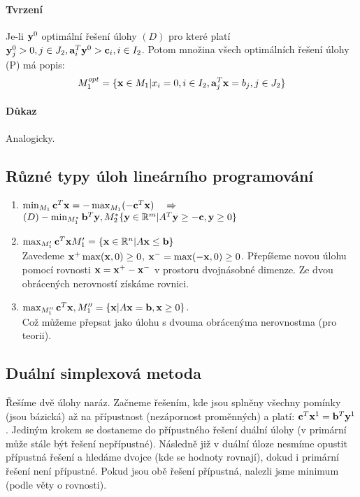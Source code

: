 \documentclass[a4paper,12pt,titlepage]{article}
\begin{document}
\begin{enumerate}
	\paragraph{Tvrzení}
	Je-li $\mathbf{y}^0$ optimální řešení úlohy $(D)$ pro které platí $\mathbf{y}_j^0 > 0, j \in
	J_2, \mathbf{a}_i^T \mathbf{y}^0 > \mathbf{c}_i, i \in I_2$. Potom množina všech optimálních
	řešení úlohy (P) má popis:
	\begin{align}
		M_1^{opt} = \{ \mathbf{x} \in M_1 | x_i = 0, i \in I_2, \mathbf{a}_j^T \mathbf{x} = b_j, j
		\in J_2 \}
	\end{align}
	\paragraph{Důkaz}
	Analogicky.

\subsection{Různé typy úloh lineárního programování}
\setcounter{equation}{0}
\begin{enumerate}
	\item $\min_{M_1} \mathbf{c}^T \mathbf{x} = - \max_{M_1} (-\mathbf{c}^T\mathbf{x}) \quad \Rightarrow
	\quad$\\
	$ (D) - \min_{M_1^*} \mathbf{b}^T \mathbf{y}, M_2^* \{ \mathbf{y} \in \mathbb{R}^m | A^T\mathbf{y}\ge -\mathbf{c},
	\mathbf{y}\ge 0\}$
	\item $\max_{M_1'} \mathbf{c}^T \mathbf{x} M_1' = \{ \mathbf{x} \in \mathbb{R}^n | A\mathbf{x} \le \mathbf{b} \}$ \\
	Zavedeme $\mathbf{x}^+ \max(\mathbf{x}, 0) \ge 0$, $\mathbf{x}^- = \max(-\mathbf{x}, 0) \ge 0$.
	Přepíšeme novou úlohu pomocí rovnosti $\mathbf{x}= \mathbf{x}^+ - \mathbf{x}^-$ v prostoru
	dvojnásobné dimenze. Ze dvou obrácených nerovností získáme rovnici.
	\item $\max_{M_1''} \mathbf{c}^T \mathbf{x}, M_1'' = \{\mathbf{x} | A\mathbf{x} = \mathbf{b}, \mathbf{x} \ge 0 \}$. \\
	Což můžeme přepsat jako úlohu s dvouma obrácenýma nerovnostma (pro teorii).
\end{enumerate}


\subsection{Duální simplexová metoda}
\setcounter{equation}{0}
Řešíme dvě úlohy naráz. Začneme řešením, kde jsou splněny všechny pomínky (jsou
bázická) až na přípustnost (nezápornost proměnných) a platí: $\mathbf{c}^T\mathbf{x}^1 = \mathbf{b}^T
\mathbf{y}^1$.
Jediným krokem se dostaneme do přípustného řešení duální úlohy (v primární může
stále být řešení nepřípustné). Následně již v duální úloze nesmíme opustit
přípustná řešení a hledáme dvojce (kde se hodnoty rovnají), dokud i primární
řešení není přípustné. Pokud jsou obě řešení přípustná, nalezli jsme minimum
(podle věty o rovnosti).






\end{enumerate}
\end{document}
